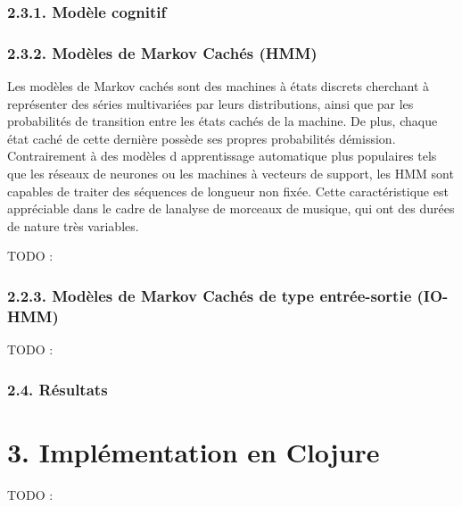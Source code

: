 \documentclass[letterpaper]{article}
\begin{document}
\subsubsection*{2.3.1. Modèle cognitif}

\subsubsection*{2.3.2. Modèles de Markov Cachés (HMM)}

Les modèles de Markov cachés sont des machines à états discrets cherchant à représenter des séries multivariées par
leurs distributions, ainsi que par les probabilités de transition entre les états cachés de la machine. De plus, chaque état
caché de cette dernière possède ses propres probabilités d\textquotesingle émission. Contrairement à des modèles d\textquotesingle
apprentissage automatique plus populaires tels que les réseaux de neurones ou les machines à vecteurs de support,
les HMM sont capables de traiter des séquences de longueur non fixée. Cette caractéristique est appréciable dans le cadre
de l\textquotesingle analyse de morceaux de musique, qui ont des durées de nature très variables.

TODO : \citep{JP} \citep{DR}

\subsubsection*{2.2.3. Modèles de Markov Cachés de type entrée-sortie (IO-HMM)}

TODO : \citep{YB}

\subsubsection*{2.4. Résultats}

\begin{table}[h]
\vskip 0.25cm
\caption{Évaluation des méthodes présentées selon différents indices :
ACC (accuracy), REL (relative keys), PAR (parallel keys) et OBF (out-by-a-fifth keys).
Le tableau reprend les scores du modèle cognitif (COGN), du modèle d\textquotesingle autocorrélation,
des modèles de Markov cachés (HMM), et du modèle de Markov caché d\textquotesingle entrée-sortie (IO-HMM).}
\end{table}

\section{3. Implémentation en Clojure}

TODO : \citep{SK}


\footnotesize


\end{document}
